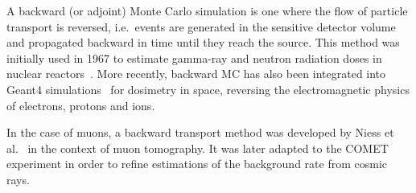 A backward (or adjoint) Monte Carlo simulation is one where the flow of particle
transport is reversed, i.e.\ events are generated in the sensitive detector
volume and propagated backward in time until they reach the source. This method
was initially used in 1967 to estimate gamma-ray and neutron radiation doses in
nuclear reactors~\cite{doi:10.13182/NSE68-A19235,doi:10.13182/NSE69-A19116}.
More recently, backward MC has also been integrated into Geant4
simulations~\cite{DESORGHER2010247} for dosimetry in space, reversing the
electromagnetic physics of electrons, protons and ions.

In the case of muons, a backward transport method was developed by Niess et
al.~\cite{Niess_Barnoud_Carloganu_Menedeu_2018} in the context of muon
tomography. It was later adapted to the COMET experiment in order to refine
estimations of the background rate from cosmic rays. 


